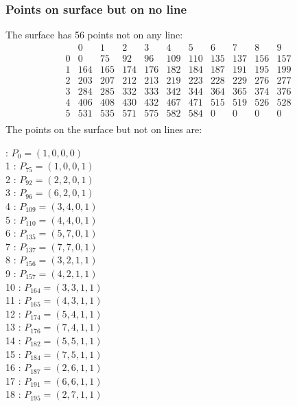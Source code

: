 \documentclass{article}
\begin{document}
{\subsubsection*{Points on surface but on no line}
The surface has 56 points not on any line:\\
$$
\begin{array}{r|*{10}{r}}
 & 0 & 1 & 2 & 3 & 4 & 5 & 6 & 7 & 8 & 9\\
\hline
0 & 0 & 75 & 92 & 96 & 109 & 110 & 135 & 137 & 156 & 157\\
1 & 164 & 165 & 174 & 176 & 182 & 184 & 187 & 191 & 195 & 199\\
2 & 203 & 207 & 212 & 213 & 219 & 223 & 228 & 229 & 276 & 277\\
3 & 284 & 285 & 332 & 333 & 342 & 344 & 364 & 365 & 374 & 376\\
4 & 406 & 408 & 430 & 432 & 467 & 471 & 515 & 519 & 526 & 528\\
5 & 531 & 535 & 571 & 575 & 582 & 584 & 0 & 0 & 0 & 0\\
\end{array}
$$
The points on the surface but not on lines are:\\
\begin{multicols}{2}
 : $P_{0}=( 1, 0, 0, 0 )$\\
1 : $P_{75}=( 1, 0, 0, 1 )$\\
2 : $P_{92}=( 2, 2, 0, 1 )$\\
3 : $P_{96}=( 6, 2, 0, 1 )$\\
4 : $P_{109}=( 3, 4, 0, 1 )$\\
5 : $P_{110}=( 4, 4, 0, 1 )$\\
6 : $P_{135}=( 5, 7, 0, 1 )$\\
7 : $P_{137}=( 7, 7, 0, 1 )$\\
8 : $P_{156}=( 3, 2, 1, 1 )$\\
9 : $P_{157}=( 4, 2, 1, 1 )$\\
10 : $P_{164}=( 3, 3, 1, 1 )$\\
11 : $P_{165}=( 4, 3, 1, 1 )$\\
12 : $P_{174}=( 5, 4, 1, 1 )$\\
13 : $P_{176}=( 7, 4, 1, 1 )$\\
14 : $P_{182}=( 5, 5, 1, 1 )$\\
15 : $P_{184}=( 7, 5, 1, 1 )$\\
16 : $P_{187}=( 2, 6, 1, 1 )$\\
17 : $P_{191}=( 6, 6, 1, 1 )$\\
18 : $P_{195}=( 2, 7, 1, 1 )$\\

\end{multicols}}
\end{document}
